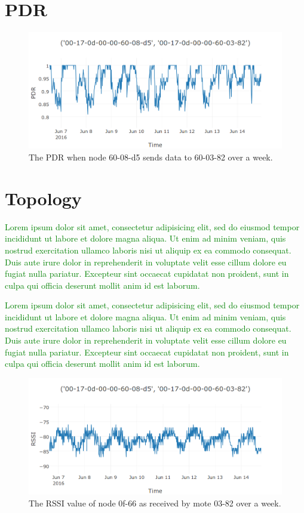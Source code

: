 \documentclass{sig-alternate}
\newcommand{\lorem}               {\textcolor{green}{Lorem ipsum dolor sit amet, consectetur adipisicing elit, sed do eiusmod tempor incididunt ut labore et dolore magna aliqua. Ut enim ad minim veniam, quis nostrud exercitation ullamco laboris nisi ut aliquip ex ea commodo consequat. Duis aute irure dolor in reprehenderit in voluptate velit esse cillum dolore eu fugiat nulla pariatur. Excepteur sint occaecat cupidatat non proident, sunt in culpa qui officia deserunt mollit anim id est laborum.}}
\begin{document}
\section{PDR}
\label{sec:pdr}

\begin{figure}
    \centering
    \includegraphics[width=\columnwidth]{periodic_pdr}
    \caption{The PDR when node 60-08-d5 sends data to 60-03-82 over a week.}
    \label{fig:periodic_pdr}
\end{figure}

\section{Topology}
\label{sec:topology}


\lorem


\lorem

\begin{figure}
    \centering
    \includegraphics[width=\columnwidth]{periodic_rssi}
    \caption{The RSSI value of node 0f-66 as received by mote 03-82 over a week.}
    \label{fig:topology}
\end{figure}
\end{document}
